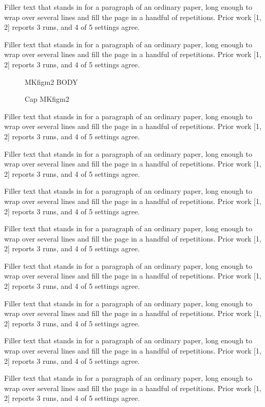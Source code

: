 \documentclass{article}
\begin{document}
Filler text that stands in for a paragraph of an ordinary paper, long enough to wrap over several lines and fill the page in a handful of repetitions. Prior work [1, 2] reports 3 runs, and 4 of 5 settings agree.\par
Filler text that stands in for a paragraph of an ordinary paper, long enough to wrap over several lines and fill the page in a handful of repetitions. Prior work [1, 2] reports 3 runs, and 4 of 5 settings agree.\par
\begin{figure}[t]\centering MKfigm2 BODY\caption{Cap MKfigm2}\label{fig:m2}\end{figure}
Filler text that stands in for a paragraph of an ordinary paper, long enough to wrap over several lines and fill the page in a handful of repetitions. Prior work [1, 2] reports 3 runs, and 4 of 5 settings agree.\par
Filler text that stands in for a paragraph of an ordinary paper, long enough to wrap over several lines and fill the page in a handful of repetitions. Prior work [1, 2] reports 3 runs, and 4 of 5 settings agree.\par
Filler text that stands in for a paragraph of an ordinary paper, long enough to wrap over several lines and fill the page in a handful of repetitions. Prior work [1, 2] reports 3 runs, and 4 of 5 settings agree.\par
Filler text that stands in for a paragraph of an ordinary paper, long enough to wrap over several lines and fill the page in a handful of repetitions. Prior work [1, 2] reports 3 runs, and 4 of 5 settings agree.\par
Filler text that stands in for a paragraph of an ordinary paper, long enough to wrap over several lines and fill the page in a handful of repetitions. Prior work [1, 2] reports 3 runs, and 4 of 5 settings agree.\par
Filler text that stands in for a paragraph of an ordinary paper, long enough to wrap over several lines and fill the page in a handful of repetitions. Prior work [1, 2] reports 3 runs, and 4 of 5 settings agree.\par
Filler text that stands in for a paragraph of an ordinary paper, long enough to wrap over several lines and fill the page in a handful of repetitions. Prior work [1, 2] reports 3 runs, and 4 of 5 settings agree.\par
Filler text that stands in for a paragraph of an ordinary paper, long enough to wrap over several lines and fill the page in a handful of repetitions. Prior work [1, 2] reports 3 runs, and 4 of 5 settings agree.\par
\end{document}
